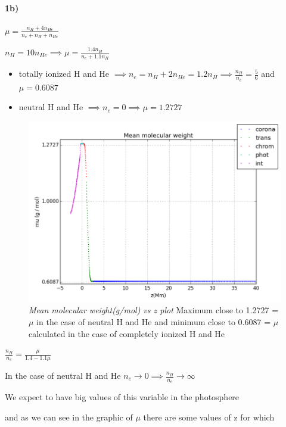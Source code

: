 \documentclass[10pt]{book}
\begin{document}
\paragraph {1b)}

$\mu = \frac{n_{H} + 4 n_{He}}{n_e + n_H + n_{He}} $

$n_H= 10 n_{He} \implies  \mu = \frac{1.4 n_H}{n_e + 1.1 n_H}$


\begin{itemize}
\item totally ionized H and He $\implies n_e = n_H + 2 n_{He} = 1.2 n_H \implies \frac{n_H}{n_e} = \frac{5}{6} $ and 
$ \mu = 0.6087 $
\item neutral H and He $\implies n_e = 0 \implies  \mu = 1.2727 $

\end{itemize}



\begin{figure}[H]
 \centering
 \includegraphics[scale=0.5]{mmmLayers.png}
 \caption{\emph{Mean molecular weight(g/mol) vs z plot} Maximum close to 1.2727 = $\mu$ in the case of neutral H and He and minimum close to 0.6087 = $\mu$ calculated in the case of completely ionized H and He }
\end{figure}

$\frac{n_H}{n_e} =  \frac{\mu}{1.4 - 1.1 \mu }   $

In the case of neutral H and He $n_e \rightarrow 0 \implies \frac{n_H}{n_e} \rightarrow \infty $

We expect to have big values of this variable in the photosphere

and as we can see in the graphic of $\mu$ there are some values of z for which
\end{document}
